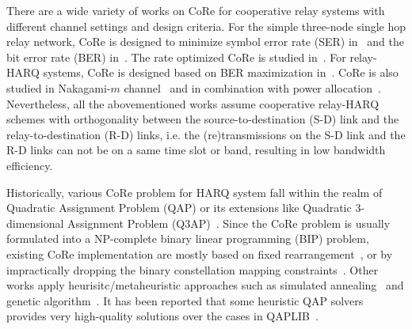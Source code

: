 \documentclass[conference]{IEEEtran}
\begin{document}
There are a wide variety of works on CoRe for cooperative relay
systems with different channel settings and design criteria.
For the simple three-node single hop relay network, CoRe is designed to minimize
symbol error rate (SER) in~\cite{seddik2008trans} and the bit error rate (BER)
in~\cite{khormuji2007improving}. The rate optimized CoRe is studied
in~\cite{khormuji2008rate}. For relay-HARQ systems, CoRe is designed based
on BER maximization in~\cite{kim2009design}. CoRe is also studied in
Nakagami-$m$ channel~\cite{ryu2011ber} and in combination with power
allocation~\cite{yu2012power}. Nevertheless, all the abovementioned
works assume cooperative relay-HARQ schemes with orthogonality between the
source-to-destination (S-D) link and the relay-to-destination (R-D) links, i.e.
the (re)transmissions on the S-D link and the R-D links can not be on a same
time slot or band, resulting in low bandwidth efficiency. 

Historically, various CoRe problem for HARQ system fall within the realm of
Quadratic Assignment Problem (QAP) or its extensions like Quadratic
3-dimensional Assignment Problem (Q3AP)~\cite{harvind2005symbol}. Since the
CoRe problem is usually formulated into a NP-complete binary linear programming
(BIP) problem, existing CoRe implementation are mostly based on fixed
rearrangement~\cite{seddik2008trans, yu2012power}, or by impractically dropping
the binary constellation mapping constraints~\cite{sediq2011optimized}.
Other works apply heurisitc/metaheuristic approaches such as simulated
annealing~\cite{khormuji2008rate} and genetic algorithm~\cite{kim2009design}.
It has been reported that some heuristic QAP solvers~\cite{stutzle2006iterated,
drezner2008extensive, james2009multistart, benlic2015memetic} provides very
high-quality solutions over the cases in QAPLIB~\cite{burkard1997qaplib}.
\end{document}
